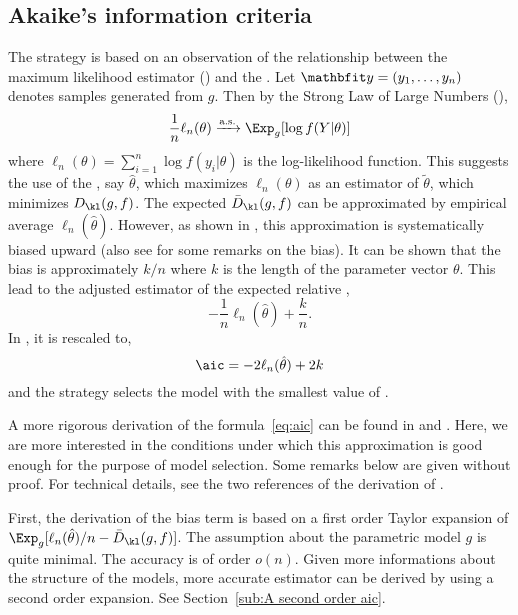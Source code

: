 \subsection{Akaike's information criteria}
\label{sub:Akaike's information criteria}

The \aic strategy is based on an observation of the relationship between the
maximum likelihood estimator (\mle) and the \kld. Let $\data =
(y_1,\dots,y_n)$ denotes \iid samples generated from $g$. Then by the Strong
Law of Large Numbers (\slln),
\begin{equation}
  \frac{1}{n}\ell_n(\theta) \xrightarrow{\text{a.s.}} \Exp_g[\log f(Y|\theta)]
  \label{eq:ml convergence}
\end{equation}
where $\ell_n(\theta) = \sum_{i=1}^n \log f(y_i|\theta)$ is the log-likelihood
function. This suggests the use of the \mle, say $\hat\theta$, which maximizes
$\ell_n(\theta)$ as an estimator of $\tilde\theta$, which minimizes
$D_{\kl}(g,f)$. The expected \kld $\bar{D}_{\kl}(g,f)$ can be approximated by
empirical average $\ell_n(\hat\theta)$. However, as shown in
\cite{Akaike:1973uc}, this approximation is systematically biased upward (also
see \cite[][sec.~2.3]{Claeskens:2008tq} for some remarks on the bias). It can
be shown that the bias is approximately $k/n$ where $k$ is the length of the
parameter vector $\theta$. This lead to the adjusted estimator of the
expected relative \kld,
\begin{equation}
  -\frac{1}{n}\ell_n(\hat\theta) + \frac{k}{n}.
\end{equation}
In \cite{Akaike:1973uc}, it is rescaled to,
\begin{equation}
  \aic = -2\ell_n(\hat\theta) + 2k
  \label{eq:aic}
\end{equation}
and the \aic strategy selects the model with the smallest value of \aic.

A more rigorous derivation of the formula~\eqref{eq:aic} can be found in
\cite[][sec.~2.3]{Claeskens:2008tq} and \cite[][sec.~6.2]{Burnham:2002wc}.
Here, we are more interested in the conditions under which this approximation
is good enough for the purpose of model selection. Some remarks below are
given without proof. For technical details, see the two references of the
derivation of \aic.

First, the derivation of the bias term is based on a first order Taylor
expansion of $\Exp_g[\ell_n(\hat\theta)/n - \bar{D}_{\kl}(g,f)]$. The
assumption about the parametric model $g$ is quite minimal. The accuracy is of
order $o(n)$. Given more informations about the structure of the models, more
accurate estimator can be derived by using a second order expansion. See
Section~\ref{sub:A second order aic}.

